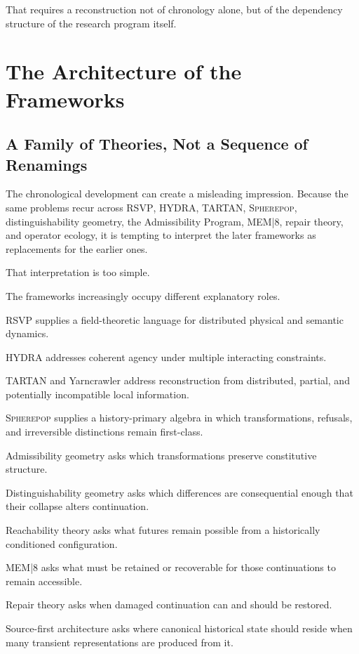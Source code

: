 \documentclass[11pt]{article}
\theoremstyle{remark}
\newcommand{\RSVP}{\textsc{RSVP}}
\newcommand{\HYDRA}{\textsc{HYDRA}}
\newcommand{\TARTAN}{\textsc{TARTAN}}
\newcommand{\MEM}{\textsc{MEM|8}}
\newcommand{\Spherepop}{\textsc{Spherepop}}
\begin{document}
That requires a reconstruction not of chronology alone, but of the dependency structure of the research program itself.

\section{The Architecture of the Frameworks}

\subsection{A Family of Theories, Not a Sequence of Renamings}

The chronological development can create a misleading impression. Because the same problems recur across \RSVP{}, \HYDRA{}, \TARTAN{}, \Spherepop{}, distinguishability geometry, the Admissibility Program, \MEM{}, repair theory, and operator ecology, it is tempting to interpret the later frameworks as replacements for the earlier ones.

That interpretation is too simple.

The frameworks increasingly occupy different explanatory roles.

\RSVP{} supplies a field-theoretic language for distributed physical and semantic dynamics.

\HYDRA{} addresses coherent agency under multiple interacting constraints.

\TARTAN{} and Yarncrawler address reconstruction from distributed, partial, and potentially incompatible local information.

\Spherepop{} supplies a history-primary algebra in which transformations, refusals, and irreversible distinctions remain first-class.

Admissibility geometry asks which transformations preserve constitutive structure.

Distinguishability geometry asks which differences are consequential enough that their collapse alters continuation.

Reachability theory asks what futures remain possible from a historically conditioned configuration.

\MEM{} asks what must be retained or recoverable for those continuations to remain accessible.

Repair theory asks when damaged continuation can and should be restored.

Source-first architecture asks where canonical historical state should reside when many transient representations are produced from it.
\end{document}
